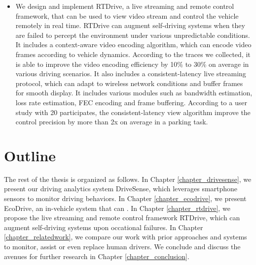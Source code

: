 \begin{itemize}
\item We design and implement RTDrive, a live streaming and remote control
framework, that can be used to view video stream and
control the vehicle remotely in real time. 
RTDrive can augment self-driving systems when they are
failed to percept the environment under various unpredictable conditions. 
It includes a context-aware video encoding algorithm,
which can encode video frames according to vehicle dynamics. 
According to the traces we collected, it is able to improve
the video encoding efficiency by 10\% to 30\% on average in 
various driving scenarios. 
It also includes a consistent-latency live streaming protocol,
which can adapt to wireless network conditions and buffer frames
for smooth display. 
It includes various modules such as bandwidth estimation, loss rate 
estimation, FEC encoding and frame buffering. 
According to a user study with 20 participates, 
the consistent-latency view algorithm improve the control
precision by more than 2x on average in a parking
task. 




\end{itemize}






\section{Outline}

The rest of the thesis is organized as follows. 
In Chapter \ref{chapter_drivesense}, we present
our driving analytics system DriveSense, which leverages smartphone
sensors to monitor driving behaviors.
In Chapter \ref{chapter_ecodrive}, we present EcoDrive, an in-vehicle
system that can . 
In Chapter \ref{chapter_rtdrive}, we propose the live streaming
and remote control framework RTDrive, which can augment
self-driving systems upon occational failures. 
In Chapter \ref{chapter_relatedwork}, we compare our work with prior
approaches and systems to monitor, assist or even replace human
drivers. 
We conclude and discuss the avenues for further research in Chapter \ref{chapter_conclusion}.



